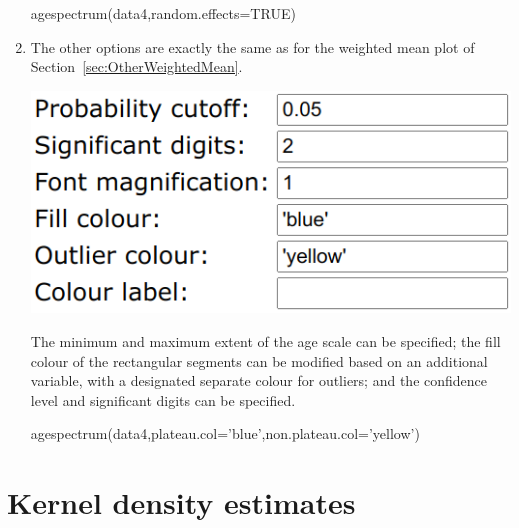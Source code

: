 \begin{refsection}
\begin{enumerate}
\begin{console}
agespectrum(data4,random.effects=TRUE)
\end{console}

\item The other options are exactly the same as for the weighted mean
  plot of Section~\ref{sec:OtherWeightedMean}.

\noindent\begin{minipage}[t]{.4\linewidth}
  \strut\vspace*{-\baselineskip}\newline
  \includegraphics[width=\linewidth]{../figures/OtherAgeSpectrumExtraOptions.png}
\end{minipage}
\begin{minipage}[t]{.6\linewidth}
  The minimum and maximum extent of the age scale can be specified;
  the fill colour of the rectangular segments can be modified based on
  an additional variable, with a designated separate colour for
  outliers; and the confidence level and significant digits can be
  specified.
\end{minipage}

\begin{console}
agespectrum(data4,plateau.col='blue',non.plateau.col='yellow')
\end{console}
  
\end{enumerate}

\section{Kernel density estimates}\label{sec:OtherKDE}


\end{refsection}
